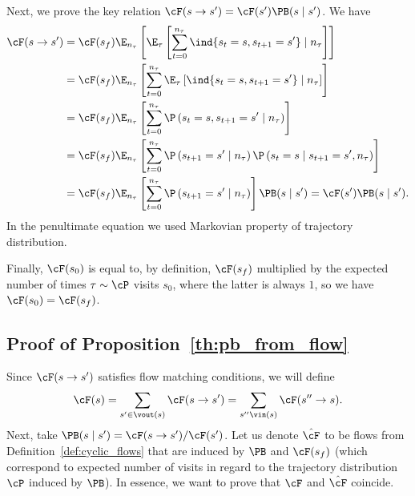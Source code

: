 Next, we prove the key relation $\cF(s \to s') = \cF(s')\PB(s \mid s')$. We have
\begin{equation*} %
\begin{split}
\cF(s \to s') & = \cF(s_f)\E_{n_\tau} \left[ \E_\tau\left[ \sum_{t = 0}^{n_{\tau}} \ind\{s_{t} = s, s_{t+1} = s'\} \mid n_\tau\right] \right]  \\
 & = \cF(s_f)\E_{n_\tau} \left[ \sum_{t = 0}^{n_{\tau}} \E_\tau\left[  \ind\{s_{t} = s, s_{t+1} = s'\} \mid n_\tau\right] \right] \\
 & = \cF(s_f)\E_{n_\tau} \left[ \sum_{t = 0}^{n_{\tau}} \P\left(s_{t} = s, s_{t+1} = s' \mid n_\tau\right) \right]  \\
  & = \cF(s_f)\E_{n_\tau} \left[ \sum_{t = 0}^{n_{\tau}} \P\left(s_{t+1} = s' \mid n_\tau\right) \P\left(s_{t} = s \mid s_{t+1} = s', n_\tau\right) \right]  \\
  & = \cF(s_f)\E_{n_\tau} \left[ \sum_{t = 0}^{n_{\tau}} \P\left(s_{t+1} = s' \mid n_\tau\right) \right] \PB(s \mid s') = \cF(s') \PB(s \mid s').\\
\end{split}
\end{equation*}
In the penultimate equation we used Markovian property of trajectory distribution.

Finally, ${\cF}(s_0)$ is equal to, by definition, $\cF(s_f)$ multiplied by the expected number of times $\tau \sim \cP$ visits $s_0$, where the latter is always $1$, so we have ${\cF}(s_0) = \cF(s_f)$.

\subsection{Proof of Proposition~\ref{th:pb_from_flow}}\label{app:pb_from_flow_proof}

Since $\cF(s \to s')$ satisfies flow matching conditions, we will define
$$\cF(s) = \sum\limits_{s' \in \vout(s)} \cF(s \to s') = \sum\limits_{s'' \vin(s)} \cF(s'' \to s).$$
Next, take $\PB(s \mid s') = \cF(s \to s') / \cF(s')$. Let us denote $\hat{\cF}$ to be flows from Definition~\ref{def:cyclic_flows} that are induced by $\PB$ and $\cF(s_f)$ (which correspond to expected number of visits in regard to the trajectory distribution $\cP$ induced by $\PB$). In essence, we want to prove that $\cF$ and $\hat{\cF}$ coincide. 

